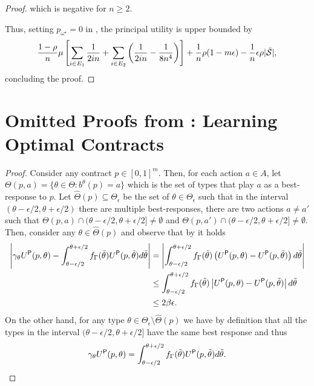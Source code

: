 \begin{proof}
	which is negative for $n\ge 2$.
	
	Thus, setting $p_{\omega^\star}=0$ in , the principal utility is upper bounded by
	\[
	\frac{1-\rho}{n}\mu\left[\sum_{i\in E_1}\frac{1}{2in}+\sum_{i\in E_2}\left(\frac{1}{2in}-\frac{1}{8n^4}\right)\right]+\frac{1}{n}\rho(1-m\epsilon)-\frac{1}{n}\epsilon\rho|\bar{\mathcal{S}}|,
	\]
    concluding the proof.
\end{proof}


\section{Omitted Proofs from : Learning Optimal Contracts}

\lemmaClose*

\begin{proof}
	Consider any contract $p\in[0,1]^m$. Then, for each action $a\in A$, let $\Theta(p,a)= \{\theta \in \Theta: b^{\theta}(p)=a\}$ which is the set of types that play $a$ as a best-response to $p$. 
    Let $\widehat \Theta(p)\subseteq \Theta_\epsilon$ be the set of $\theta \in \Theta_\epsilon$ such that in the interval $(\theta-\epsilon/2, \theta+\epsilon/2)$ there are multiple best-responses, \ie there are two actions $a\neq a'$ such that $\Theta(p,a)\cap (\theta-\epsilon/2,\theta+\epsilon/2]\neq\emptyset$ and $\Theta(p,a') \cap (\theta-\epsilon/2,\theta+\epsilon/2]\neq \emptyset$.
	Then, consider any $\theta\in\widehat\Theta(p)$ and observe that by  it holds
    \begin{align*}
        \left| \gamma_\theta U^\textsf{P}(p,\theta)-\int_{\theta-\epsilon/2}^{\theta+\epsilon/2} f_\Gamma(\tilde \theta) U^\textsf{P}(p,\tilde \theta)d\tilde\theta \right|&= \left| \int_{\theta-\epsilon/2}^{\theta+\epsilon/2} f_\Gamma(\tilde \theta) \left(U^\textsf{P}(p, \theta)-U^\textsf{P}(p,\tilde \theta)\right)d\tilde\theta \right|\\
        &\le \int_{\theta-\epsilon/2}^{\theta+\epsilon/2}f_\Gamma(\tilde \theta) \left|U^\textsf{P}(p, \theta)-U^\textsf{P}(p,\tilde \theta)\right|d\tilde\theta\\
        &\le 2\beta\epsilon.
    \end{align*}
%
    On the other hand, for any type $\theta\in\Theta_\epsilon\setminus\widehat\Theta(p)$ we have by definition that all the types in the interval $(\theta-\epsilon/2,\theta+\epsilon/2]$ have the same best response and thus
    \[
    \gamma_\theta U^\textsf{P}(p,\theta)=\int_{\theta-\epsilon/2}^{\theta+\epsilon/2} f_\Gamma(\tilde\theta) U^\textsf{P}(p,\tilde\theta)d\tilde\theta.
\]
\end{proof}
